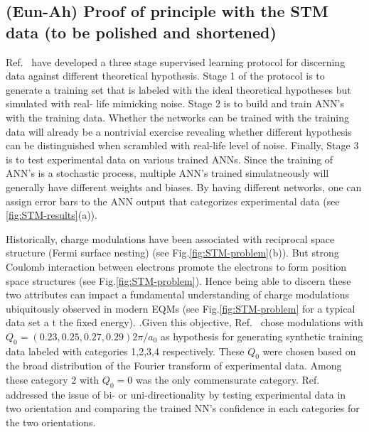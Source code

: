\documentclass[aps,prb,floatfix,amsmath,amssymb,amsfonts,10pt,floatfix,longbibliography]{revtex4-1}
\begin{document}
\begin{enumerate}
\subsection{(Eun-Ah) Proof of principle with the STM data (to be polished and shortened)}
 Ref.~\cite{Zhang2018} have developed a three stage supervised learning protocol for discerning data against different theoretical hypothesis.
Stage
1 of the protocol is to 
generate a training set that
is labeled with the ideal theoretical
hypotheses but simulated with real-
life mimicking noise. Stage 2 is to  build and train 
ANN’s with the training data.
Whether the networks  can be trained with the
training data will already be a nontrivial
exercise revealing whether different hypothesis
 can be distinguished
when scrambled with real-life level of
noise. 
Finally, Stage 3 is to test
experimental data on various
trained ANNs. Since the training of ANN's is a stochastic process, multiple ANN's trained simulatneously will generally have different weights and biases. By having different networks, one can assign error bars to the ANN output that categorizes experimental data (see \ref{fig:STM-results}(a)).

 

Historically, charge modulations have been associated with reciprocal space structure (Fermi surface nesting)\cite{gruner} (see Fig.\ref{fig:STM-problem}(b)). But
  strong Coulomb interaction between electrons promote the electrons to form position space structures (see Fig.\ref{fig:STM-problem}). 
 Hence being able to discern these two attributes can impact a fundamental understanding of charge modulations ubiquitously observed in modern EQMs \cite{Abbamonte2005,Ghiringhelli2012,Kogar2017,Zhang2016,Gerber2015,Bugaris2017,CoBaNi2As2} (see Fig.\ref{fig:STM-problem} for a typical data set a t the fixed energy). 
\cite{Robertson2006,DelMaestro2006}.Given this objective, Ref.~\cite{Zhang2018} chose  modulations with $Q_0=(0.23, 0.25, 0.27, 0.29)2\pi/a_0$ as hypothesis  for generating synthetic training data labeled with categories 1,2,3,4 respectively. These $Q_0$ were chosen based on the broad distribution of the Fourier transform of experimental data. Among these category 2 with $Q_0=0$ was the only commensurate category. 
 Ref.~\cite{Zhang2018} addressed the issue of bi- or uni-directionality by testing experimental data in two orientation and comparing the trained NN's confidence in each categories for the two orientations. 


\end{enumerate}
\end{document}

